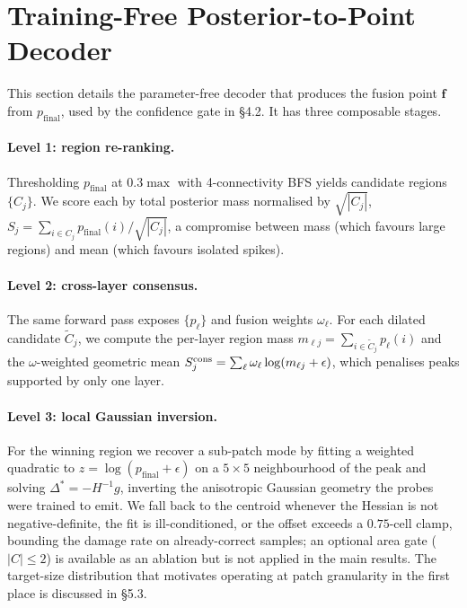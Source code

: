 \section{Training-Free Posterior-to-Point Decoder}
\label{app:p2p}

This section details the parameter-free decoder that produces the fusion point $\mathbf{f}$ from $p_{\mathrm{final}}$, used by the confidence gate in \S4.2. It has three composable stages.

\paragraph{Level 1: region re-ranking.}
Thresholding $p_{\mathrm{final}}$ at $0.3\max$ with 4-connectivity BFS yields candidate regions $\{C_j\}$. We score each by total posterior mass normalised by $\sqrt{|C_j|}$, $S_j = \sum_{i\in C_j} p_{\mathrm{final}}(i)/\sqrt{|C_j|}$, a compromise between mass (which favours large regions) and mean (which favours isolated spikes).

\paragraph{Level 2: cross-layer consensus.}
The same forward pass exposes $\{p_\ell\}$ and fusion weights $\omega_\ell$. For each dilated candidate $\widetilde C_j$, we compute the per-layer region mass $m_{\ell j}=\sum_{i\in\widetilde C_j} p_\ell(i)$ and the $\omega$-weighted geometric mean $S_j^{\rm cons}=\sum_\ell \omega_\ell\log(m_{\ell j}+\epsilon)$, which penalises peaks supported by only one layer.

\paragraph{Level 3: local Gaussian inversion.}
For the winning region we recover a sub-patch mode by fitting a weighted quadratic to $z=\log(p_{\mathrm{final}}+\epsilon)$ on a $5\times5$ neighbourhood of the peak and solving $\Delta^{*}=-H^{-1}g$, inverting the anisotropic Gaussian geometry the probes were trained to emit. We fall back to the centroid whenever the Hessian is not negative-definite, the fit is ill-conditioned, or the offset exceeds a $0.75$-cell clamp, bounding the damage rate on already-correct samples; an optional area gate ($|C|\le2$) is available as an ablation but is not applied in the main results. The target-size distribution that motivates operating at patch granularity in the first place is discussed in \S5.3.

